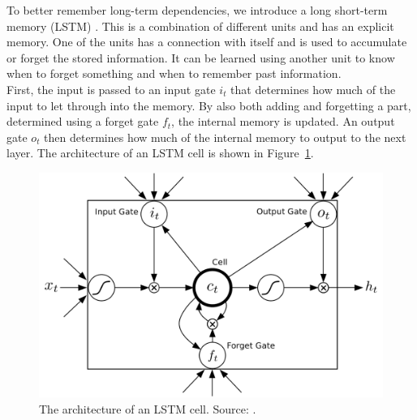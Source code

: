 To better remember long-term dependencies, we introduce a long short-term memory (LSTM) \parencite{Hochreiter1997LSTM}. This is a combination of different units and has an explicit memory. One of the units has a connection with itself and is used to accumulate or forget the stored information. It can be learned using another unit to know when to forget something and when to remember past information.\\
First, the input is passed to an input gate $i_t$ that determines how much of the input to let through into the memory. By also both adding and forgetting a part, determined using a forget gate $f_t$, the internal memory is updated. An output gate $o_t$ then determines how much of the internal memory to output to the next layer.
The architecture of an LSTM cell is shown in Figure~\ref{fig:lstm}.
\begin{figure}[htb]
    \centering
    \includegraphics[width=.8\linewidth]{images/lstm.png}
    \caption[Long short-term memory cell]{The architecture of an LSTM cell. Source: \cite{journals/corr/Graves13}.}
    \label{fig:lstm}
\end{figure}
\\

